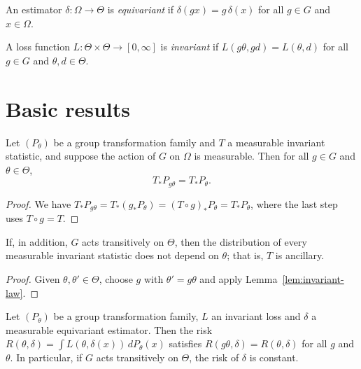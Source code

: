 \begin{definition}
  \label{def:equivariant-estimator}
  An estimator $\delta : \Omega \to \Theta$ is \emph{equivariant} if
  $\delta(gx) = g\,\delta(x)$ for all $g \in G$ and $x \in \Omega$.
\end{definition}

\begin{definition}
  \label{def:invariant-loss}
  A loss function $L : \Theta \times \Theta \to [0, \infty]$ is \emph{invariant} if
  $L(g\theta, gd) = L(\theta, d)$ for all $g \in G$ and $\theta, d \in \Theta$.
\end{definition}

\section{Basic results}

\begin{lemma}
  \label{lem:invariant-law}
  \leanok
  Let $(P_\theta)$ be a group transformation family and $T$ a measurable invariant
  statistic, and suppose the action of $G$ on $\Omega$ is measurable. Then for all
  $g \in G$ and $\theta \in \Theta$,
  \[ T_* P_{g\theta} = T_* P_\theta. \]
\end{lemma}

\begin{proof}
  \leanok
  We have $T_* P_{g\theta} = T_* (g_* P_\theta) = (T \circ g)_* P_\theta = T_* P_\theta$,
  where the last step uses $T \circ g = T$.
\end{proof}

\begin{corollary}
  \label{cor:ancillary}
  If, in addition, $G$ acts transitively on $\Theta$, then the distribution of every
  measurable invariant statistic does not depend on $\theta$; that is, $T$ is ancillary.
\end{corollary}

\begin{proof}
  Given $\theta, \theta' \in \Theta$, choose $g$ with $\theta' = g\theta$ and apply
  Lemma~\ref{lem:invariant-law}.
\end{proof}

\begin{theorem}
  \label{thm:constant-risk}
  Let $(P_\theta)$ be a group transformation family, $L$ an invariant loss and $\delta$
  a measurable equivariant estimator. Then the risk
  $R(\theta, \delta) = \int L(\theta, \delta(x))\, dP_\theta(x)$ satisfies
  $R(g\theta, \delta) = R(\theta, \delta)$ for all $g$ and $\theta$. In particular, if
  $G$ acts transitively on $\Theta$, the risk of $\delta$ is constant.
\end{theorem}

